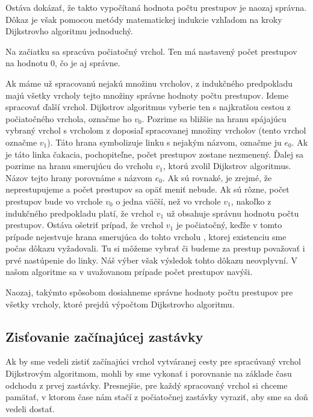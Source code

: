 Ostáva dokázať, že takto vypočítaná hodnota počtu prestupov je naozaj správna. Dôkaz je však pomocou metódy matematickej indukcie vzhľadom na kroky Dijkstrovho algoritmu jednoduchý.\newline

Na začiatku sa spracúva počiatočný vrchol. Ten má nastavený počet prestupov na hodnotu 0, čo je aj správne.\newline

Ak máme už spracovanú nejakú množinu vrcholov, z indukčného predpokladu majú všetky vrcholy tejto množiny správne hodnoty počtu prestupov. Ideme spracovať ďalší vrchol. Dijkstrov algoritmus vyberie ten s najkratšou cestou z počiatočného vrchola, označme ho $v_{0}$. Pozrime sa bližšie na hranu spájajúcu vybraný vrchol s vrcholom z doposiaľ spracovanej množiny vrcholov (tento vrchol označme $v_{1}$). Táto hrana symbolizuje linku s nejakým názvom, označme ju $e_{0}$. Ak je táto linka čakacia, pochopiteľne, počet prestupov zostane nezmenený. Ďalej sa pozrime na hranu smerujúcu do vrcholu $v_{1}$, ktorú zvolil Dijkstrov algoritmus. Názov tejto hrany porovnáme s názvom $e_{0}$. Ak sú rovnaké, je zrejmé, že neprestupujeme a počet prestupov sa opäť meniť nebude. Ak sú rôzne, počet prestupov bude vo vrchole $v_{0}$ o jedna väčší, než vo vrchole $v_{1}$, nakoľko z indukčného predpokladu platí, že vrchol $v_{1}$ už obsahuje správnu hodnotu počtu prestupov. Ostáva ošetriť prípad, že vrchol $v_{1}$ je počiatočný, keďže v tomto prípade nejestvuje hrana smerujúca do tohto vrcholu , ktorej existenciu sme počas dôkazu vyžadovali. Tu si môžeme vybrať či budeme za prestup považovať i prvé nastúpenie do linky. Náš výber však výsledok tohto dôkazu neovplyvní. V našom algoritme sa v uvažovanom prípade počet prestupov navýši.\newline

Naozaj, takýmto spôsobom dosiahneme správne hodnoty počtu prestupov pre všetky vrcholy, ktoré prejdú výpočtom Dijkstrovho algoritmu.\newline

\subsection{Zisťovanie začínajúcej zastávky}

Ak by sme vedeli zistiť začínajúci vrchol vytváranej cesty pre spracúvaný vrchol Dijkstrovým algoritmom, mohli by sme vykonať i porovnanie na základe času odchodu z prvej zastávky. Presnejšie, pre každý spracovaný vrchol si chceme pamätať, v ktorom čase nám stačí z počiatočnej zastávky vyraziť, aby sme sa doň vedeli dostať.\newline

